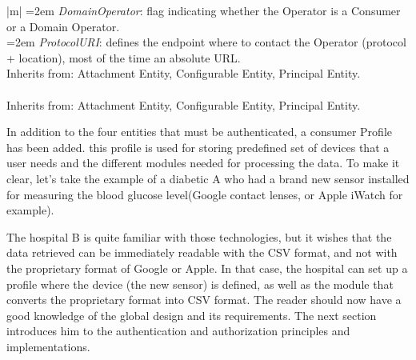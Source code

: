 \begin{longtable}{|m{\textwidth}|}
  	 \hspace{2em}\hangindent=2em \tabitem \textit{DomainOperator}: flag indicating whether the Operator is a Consumer or a Domain Operator.
  	\\
  	\hspace{2em}\hangindent=2em	\tabitem \textit{ProtocolURI}: defines the endpoint where to contact the Operator (protocol + location), most of the time an absolute URL. 
  	\\
  	Inherits from: Attachment Entity, Configurable Entity, Principal Entity. 
%  		
  	\\	\hline
  	\\
  	Inherits from: Attachment Entity, Configurable Entity, Principal Entity.
  	\\	\hline
  \end{longtable}
 
In addition to the four entities that must be authenticated, a consumer Profile has been added. this profile is used for storing predefined set of devices that a user needs and the different modules needed for processing the data. To make it clear, let's take the example of a diabetic A who had a brand new sensor installed for measuring the blood glucose level(Google contact lenses, or Apple iWatch for example).

The hospital B is quite familiar with those technologies, but it wishes that the data retrieved can be immediately readable with the CSV format, and not with the proprietary format of Google or Apple. In that case, the hospital can set up a profile where the device (the new sensor) is defined, as well as the module that converts the proprietary format into CSV format.
\linebreak
\linebreak
\linebreak
The reader should now have a good knowledge of the global design and its requirements. The next section introduces him to the authentication and authorization principles and implementations.

